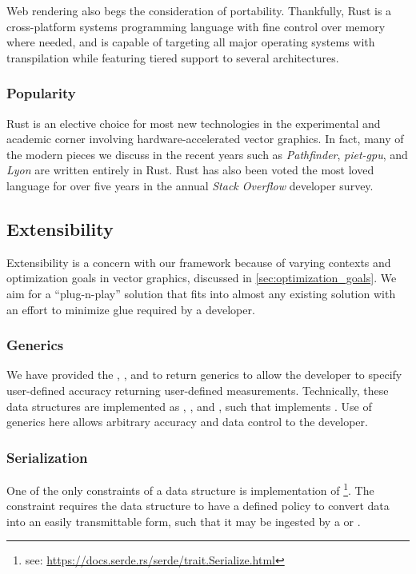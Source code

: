 Web rendering also begs the consideration of portability. Thankfully, Rust is a cross-platform systems programming language with fine control over memory where needed, and is capable of targeting all major operating systems with transpilation while featuring tiered support to several architectures.

\subsubsection{Popularity}
Rust is an elective choice for most new technologies in the experimental and academic corner involving hardware-accelerated vector graphics. In fact, many of the modern pieces we discuss in the recent years such as \textit{Pathfinder}, \textit{piet-gpu}, and \textit{Lyon} are written entirely in Rust. Rust has also been voted the most loved language for over five years in the annual \textit{Stack Overflow} developer survey\cite{StackDeveloperSurvey}.

\subsection{Extensibility}
Extensibility is a concern with our framework because of varying contexts and optimization goals in vector graphics, discussed in \cref{sec:optimization_goals}. We aim for a ``plug-n-play'' solution that fits into almost any existing solution with an effort to minimize glue required by a developer.
\subsubsection{Generics}
We have provided the , , and  to return generics to allow the developer to specify user-defined accuracy returning user-defined measurements. Technically, these data structures are implemented as , , and , such that  implements . Use of generics here allows arbitrary accuracy and data control to the developer. 

\subsubsection{Serialization}
One of the only constraints of a  data structure is implementation of \footnote{see: \href{https://docs.serde.rs/serde/trait.Serialize.html}{https://docs.serde.rs/serde/trait.Serialize.html}}. The constraint requires the data structure to have a defined policy to convert data into an easily transmittable form, such that it may be ingested by a  or .

